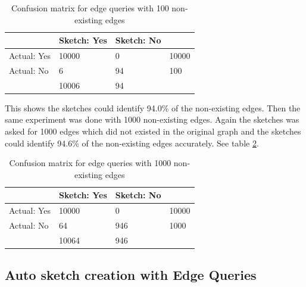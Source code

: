 \documentclass[conference]{IEEEtran}
\begin{document}
\begin{table}[!b]
\caption{Confusion matrix for edge queries with 100 non-existing edges}
\label{table:Confusion matrix for edge queries with 100 non-existing edges}
\renewcommand{\arraystretch}{1.5}
\centering
\begin{tabular}{l|l|l|l}
\cline{2-3}
                                  & Sketch: Yes & Sketch: No &                            \\ \hline
\multicolumn{1}{|l|}{Actual: Yes} & 10000       & 0          & \multicolumn{1}{l|}{10000} \\ \hline
\multicolumn{1}{|l|}{Actual: No}  & 6          & 94        & \multicolumn{1}{l|}{100}  \\ \hline
                                  & 10006       & 94        &                            \\ \cline{2-3}
\end{tabular}
\end{table}

This shows the sketches could identify 94.0\% of the non-existing edges. Then the same experiment was  done with 1000 non-existing edges. Again  the sketches was asked for 1000 edges which did not existed in the original graph and the sketches could identify 94.6\% of the non-existing edges accurately. See table \ref{table:Confusion matrix for edge queries with 1000 non-existing edges}.

\begin{table}[!b]
\caption{Confusion matrix for edge queries with 1000 non-existing edges}
\label{table:Confusion matrix for edge queries with 1000 non-existing edges}
\renewcommand{\arraystretch}{1.5}
\centering
\begin{tabular}{l|l|l|l}
\cline{2-3}
                                  & Sketch: Yes & Sketch: No &                            \\ \hline
\multicolumn{1}{|l|}{Actual: Yes} & 10000       & 0          & \multicolumn{1}{l|}{10000} \\ \hline
\multicolumn{1}{|l|}{Actual: No}  & 64          & 946        & \multicolumn{1}{l|}{1000}  \\ \hline
                                  & 10064       & 946        &                            \\ \cline{2-3}
\end{tabular}
\end{table}


\subsection{Auto sketch creation with Edge Queries}
\end{document}
